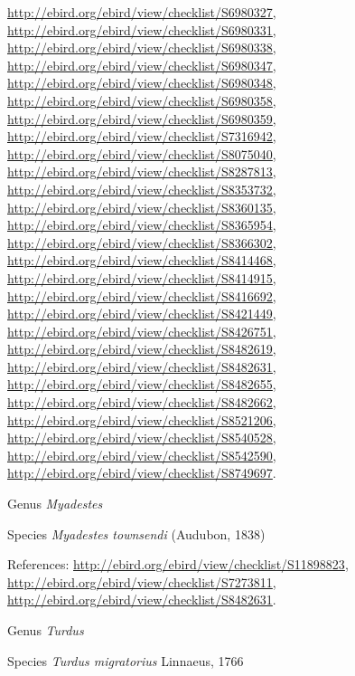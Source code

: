\documentclass[9pt, article]{memoir}
\begin{document}
\begin{multicols}{2}
\url{http://ebird.org/ebird/view/checklist/S6980327}, 
\url{http://ebird.org/ebird/view/checklist/S6980331}, 
\url{http://ebird.org/ebird/view/checklist/S6980338}, 
\url{http://ebird.org/ebird/view/checklist/S6980347}, 
\url{http://ebird.org/ebird/view/checklist/S6980348}, 
\url{http://ebird.org/ebird/view/checklist/S6980358}, 
\url{http://ebird.org/ebird/view/checklist/S6980359}, 
\url{http://ebird.org/ebird/view/checklist/S7316942}, 
\url{http://ebird.org/ebird/view/checklist/S8075040}, 
\url{http://ebird.org/ebird/view/checklist/S8287813}, 
\url{http://ebird.org/ebird/view/checklist/S8353732}, 
\url{http://ebird.org/ebird/view/checklist/S8360135}, 
\url{http://ebird.org/ebird/view/checklist/S8365954}, 
\url{http://ebird.org/ebird/view/checklist/S8366302}, 
\url{http://ebird.org/ebird/view/checklist/S8414468}, 
\url{http://ebird.org/ebird/view/checklist/S8414915}, 
\url{http://ebird.org/ebird/view/checklist/S8416692}, 
\url{http://ebird.org/ebird/view/checklist/S8421449}, 
\url{http://ebird.org/ebird/view/checklist/S8426751}, 
\url{http://ebird.org/ebird/view/checklist/S8482619}, 
\url{http://ebird.org/ebird/view/checklist/S8482631}, 
\url{http://ebird.org/ebird/view/checklist/S8482655}, 
\url{http://ebird.org/ebird/view/checklist/S8482662}, 
\url{http://ebird.org/ebird/view/checklist/S8521206}, 
\url{http://ebird.org/ebird/view/checklist/S8540528}, 
\url{http://ebird.org/ebird/view/checklist/S8542590}, 
\url{http://ebird.org/ebird/view/checklist/S8749697}.

\vspace{6pt}\noindent\hspace{30pt}Genus \textit{Myadestes}


\vspace{6pt}\noindent\hspace{36pt}Species \textit{Myadestes townsendi} (Audubon, 1838)


\vspace{6pt}References: 
\url{http://ebird.org/ebird/view/checklist/S11898823}, 
\url{http://ebird.org/ebird/view/checklist/S7273811}, 
\url{http://ebird.org/ebird/view/checklist/S8482631}.

\vspace{6pt}\noindent\hspace{30pt}Genus \textit{Turdus}


\vspace{6pt}\noindent\hspace{36pt}Species \textit{Turdus migratorius} Linnaeus, 1766



\end{multicols}
\end{document}
